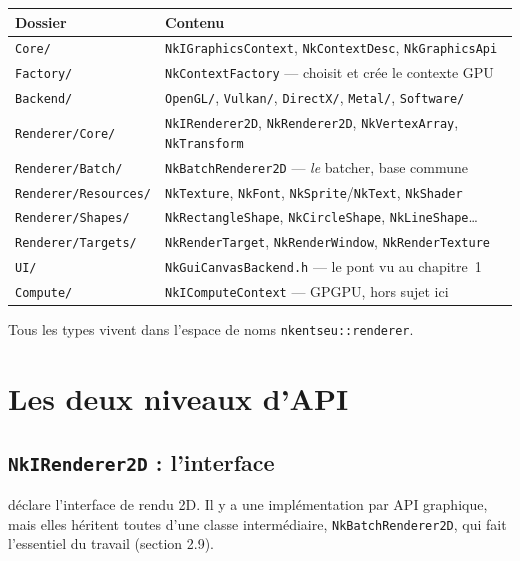 \begin{center}
\begin{tabular}{@{}ll@{}}
\toprule
\textbf{Dossier} & \textbf{Contenu} \\
\midrule
\texttt{Core/}      & \texttt{NkIGraphicsContext}, \texttt{NkContextDesc}, \texttt{NkGraphicsApi} \\
\texttt{Factory/}   & \texttt{NkContextFactory} — choisit et crée le contexte GPU \\
\texttt{Backend/}   & \texttt{OpenGL/}, \texttt{Vulkan/}, \texttt{DirectX/}, \texttt{Metal/}, \texttt{Software/} \\
\texttt{Renderer/Core/}      & \texttt{NkIRenderer2D}, \texttt{NkRenderer2D}, \texttt{NkVertexArray}, \texttt{NkTransform} \\
\texttt{Renderer/Batch/}     & \texttt{NkBatchRenderer2D} — \emph{le} batcher, base commune \\
\texttt{Renderer/Resources/} & \texttt{NkTexture}, \texttt{NkFont}, \texttt{NkSprite}/\texttt{NkText}, \texttt{NkShader} \\
\texttt{Renderer/Shapes/}    & \texttt{NkRectangleShape}, \texttt{NkCircleShape}, \texttt{NkLineShape}\dots \\
\texttt{Renderer/Targets/}   & \texttt{NkRenderTarget}, \texttt{NkRenderWindow}, \texttt{NkRenderTexture} \\
\texttt{UI/}        & \texttt{NkGuiCanvasBackend.h} — le pont vu au chapitre~1 \\
\texttt{Compute/}   & \texttt{NkIComputeContext} — GPGPU, hors sujet ici \\
\bottomrule
\end{tabular}
\end{center}

Tous les types vivent dans l'espace de noms \texttt{nkentseu::renderer}.

\section{Les deux niveaux d'API}

\subsection{\texttt{NkIRenderer2D} : l'interface}

déclare l'interface de rendu 2D. Il y a une implémentation par API graphique,
mais elles héritent toutes d'une classe intermédiaire, \texttt{NkBatchRenderer2D},
qui fait l'essentiel du travail (section 2.9).


